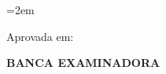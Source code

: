 

\clearpage
\thispagestyle{empty}

\begin{center}
    \autor\par
    \vspace{2.6cm}
    \titulo
\end{center}

\vspace{2.3cm}

\noindent\hfill
\begin{minipage}{0.54\textwidth}
    \setlength{\parindent}{0pt}
    \justifying
    \emergencystretch=2em

    \noindent\naturezadotrabalho\par
\end{minipage}

\par\vspace{1.5cm}

\noindent Aprovada em: \datadeaprovacao

\begin{center}
    \vspace{0.8cm}
    \textbf{BANCA EXAMINADORA}
\end{center}

\ImprimirBanca

\vfill
\clearpage
